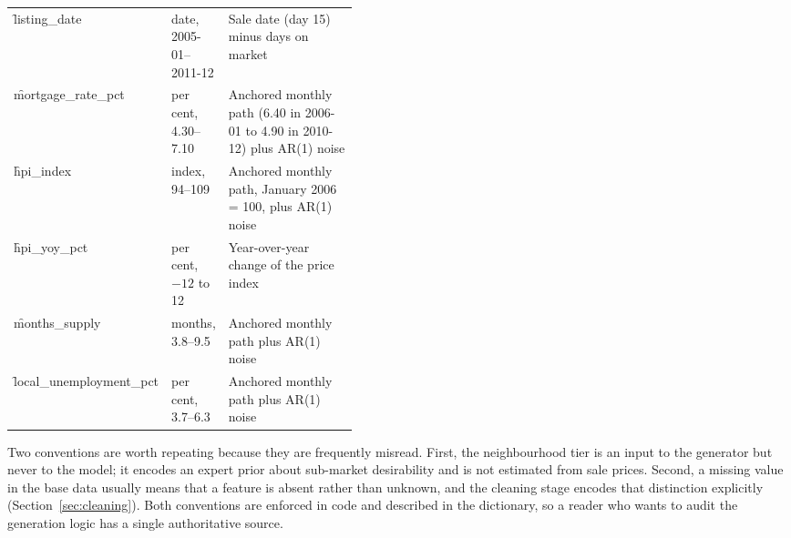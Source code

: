 \begin{table}[htbp]
\begin{tabularx}{\linewidth}{@{}L{0.30\linewidth}L{0.135\linewidth}X@{}}
\f{listing\_date} & date, 2005-01--2011-12 & Sale date (day 15) minus days on market \\
\f{mortgage\_rate\_pct} & per cent, 4.30--7.10 & Anchored monthly path (6.40 in 2006-01 to 4.90 in 2010-12) plus AR(1) noise \\
\f{hpi\_index} & index, 94--109 & Anchored monthly path, January 2006 = 100, plus AR(1) noise \\
\f{hpi\_yoy\_pct} & per cent, $-12$ to 12 & Year-over-year change of the price index \\
\f{months\_supply} & months, 3.8--9.5 & Anchored monthly path plus AR(1) noise \\
\f{local\_unemployment\_pct} & per cent, 3.7--6.3 & Anchored monthly path plus AR(1) noise \\
\bottomrule
\end{tabularx}
\end{table}

Two conventions are worth repeating because they are frequently misread. First, the
neighbourhood tier is an input to the generator but never to the model; it encodes an
expert prior about sub-market desirability and is not estimated from sale prices.
Second, a missing value in the base data usually means that a feature is absent rather
than unknown, and the cleaning stage encodes that distinction explicitly
(Section~\ref{sec:cleaning}). Both conventions are enforced in code and described in
the dictionary, so a reader who wants to audit the generation logic has a single
authoritative source.
